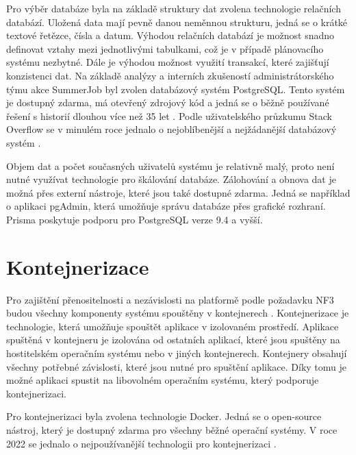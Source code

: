 Pro výběr databáze byla na základě struktury dat zvolena technologie relačních databází. Uložená data mají pevně danou neměnnou strukturu,
jedná se o krátké textové řetězce, čísla a datum. Výhodou relačních databází je možnost snadno definovat vztahy mezi jednotlivými tabulkami,
což je v případě plánovacího systému nezbytné. Dále je výhodou možnost využití transakcí, které zajišťují konzistenci dat.
Na základě analýzy a interních zkušeností administrátorského týmu akce SummerJob byl zvolen databázový systém PostgreSQL. Tento systém je
dostupný zdarma, má otevřený zdrojový kód a jedná se o běžně používané řešení s historií dlouhou více než 35 let \cite{postgresql}.
Podle uživatelského průzkumu Stack Overflow se v minulém roce jednalo o nejoblíbenější a nejžádanější databázový systém \cite{so_dev_survey_db}.

Objem dat a počet současných uživatelů systému je relativně malý, proto není nutné využívat technologie pro škálování databáze. Zálohování a obnova dat
je možná přes externí nástroje, které jsou také dostupné zdarma. Jedná se například o aplikaci pgAdmin, která umožňuje správu databáze přes grafické rozhraní.
Prisma poskytuje podporu pro PostgreSQL verze 9.4 a vyšší.

\section{Kontejnerizace}

Pro zajištění přenositelnosti a nezávislosti na platformě podle požadavku NF3 budou všechny komponenty systému spouštěny v kontejnerech \cite{what_is_container}.
Kontejnerizace je technologie, která umožňuje spouštět aplikace v izolovaném prostředí. Aplikace spuštěná v kontejneru je izolována od ostatních aplikací,
které jsou spuštěny na hostitelském operačním systému nebo v jiných kontejnerech. Kontejnery obsahují
všechny potřebné závislosti, které jsou nutné pro spuštění aplikace. Díky tomu je možné aplikaci spustit na libovolném operačním systému, který podporuje kontejnerizaci.

Pro kontejnerizaci byla zvolena technologie Docker. Jedná se o open-source nástroj, který je dostupný zdarma pro všechny běžné operační systémy.
V roce 2022 se jednalo o nejpoužívanější technologii pro kontejnerizaci \cite{docker_survey}.

